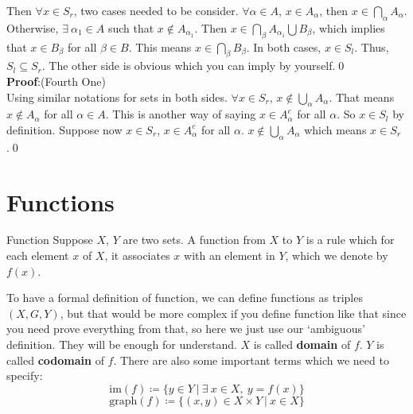 \documentclass{article}
\begin{document}
Then $\forall x \in S_r$, two cases needed to be consider. $\forall \alpha \in A$, $x \in A_{\alpha}$, then
$x \in \bigcap_{\alpha} A_{\alpha}$. Otherwise, $\exists\ \alpha_1 \in A$ such that $x \notin A_{\alpha_1}$. Then 
$x \in \bigcap_{\beta} A_{\alpha_1} \bigcup B_{\beta}$, which implies that $x \in B_{\beta}$ for all $\beta \in B$. 
This means $x \in \bigcap_{\beta} B_{\beta}$. In both cases, $x \in S_l$. Thus, $S_l \subseteq S_r$. The other side 
is obvious which you can imply by yourself.\qed\\
\textbf{Proof}:(Fourth One)\\
Using similar notations for sets in both sides. $\forall x \in S_r$, $x \notin \bigcup_{\alpha} A_{\alpha}$. That means $x \notin A_\alpha$ for
all $\alpha \in A$. This is another way of saying $x \in A_{\alpha}^c$ for all $\alpha$. So $x \in S_l$ by definition. Suppose 
now $x \in S_r$, $x \in A_{\alpha}^c$ for all $\alpha$. $x \notin \bigcup_{\alpha} A_{\alpha}$ which means $x \in S_r$.\qed
\newpage
\section{Functions}
\begin{defin}{Function}
    Suppose $X$, $Y$ are two sets. A function from $X$ to $Y$ is a rule which for each element $x$ of $X$, it associates $x$ with an element in $Y$, 
    which we denote by $f(x)$.
\end{defin}
To have a formal definition of function, we can define functions as triples $(X, G, Y)$, but that would be more complex if you define function like that since you need 
prove everything from that, so here we just use our `ambiguous' definition. They will be enough for understand. $X$ is called \textbf{domain} of $f$. $Y$ is called \textbf{codomain} of $f$. There are also some important terms which we need to specify:
$$
\text{im}(f) \coloneq \{y \in Y\ |\ \exists\ x \in X,\ y = f(x)\}
$$
$$
\text{graph}(f) \coloneq \{(x,y) \in X \times Y\ |\ x \in X\}
$$
\end{document}
